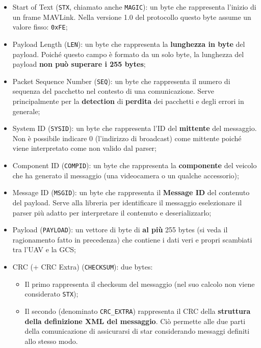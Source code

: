 \documentclass[a4paper, 12pt, oneside]{article}
\theoremstyle{definition}
\begin{document}
\begin{itemize}
    \item Start of Text (\texttt{STX}, chiamato anche \texttt{MAGIC}): un byte che rappresenta l'inizio di un frame MAVLink. Nella versione 1.0 del protocollo questo byte assume un valore fisso: \texttt{0xFE};
    \item Payload Length (\texttt{LEN}): un byte che rappresenta la \textbf{lunghezza in byte} del payload. Poiché questo campo è formato da un solo byte, la lunghezza del payload \textbf{non può superare i 255 bytes};
    \item Packet Sequence Number (\texttt{SEQ}): un byte che rappresenta il numero di sequenza del pacchetto nel contesto di una comunicazione. Serve principalmente per la \textbf{detection} di \textbf{perdita} dei pacchetti e degli errori in generale;
    \item System ID (\texttt{SYSID}): un byte che rappresenta l'ID del \textbf{mittente} del messaggio. Non è possibile indicare 0 (l'indirizzo di broadcast) come mittente poiché viene interpretato come non valido dal parser;
    \item Component ID (\texttt{COMPID}): un byte che rappresenta la \textbf{componente} del veicolo che ha generato il messaggio (una videocamera o un qualche accessorio);
    \item Message ID (\texttt{MSGID}): un byte che rappresenta il \textbf{Message ID} del contenuto del payload. Serve alla libreria per identificare il messaggio eselezionare il parser più adatto per interpretare il contenuto e deserializzarlo;
    \item Payload (\texttt{PAYLOAD}): un vettore di byte di \textbf{al più} 255 bytes (si veda il ragionamento fatto in precedenza) che contiene i dati veri e propri scambiati tra l'UAV e la GCS;
    \item CRC (+ CRC Extra) (\texttt{CHECKSUM}): due bytes: \begin{itemize}
        \item Il primo rappresenta il checksum del messaggio (nel suo calcolo non viene considerato \texttt{STX});
        \item Il secondo (denominato \texttt{CRC\_EXTRA}) rappresenta il CRC della \textbf{struttura della definizione XML del messaggio}. Ciò permette alle due parti della comunicazione di assicurarsi di star considerando messaggi definiti allo stesso modo.
    \end{itemize}
\end{itemize}
\end{document}
